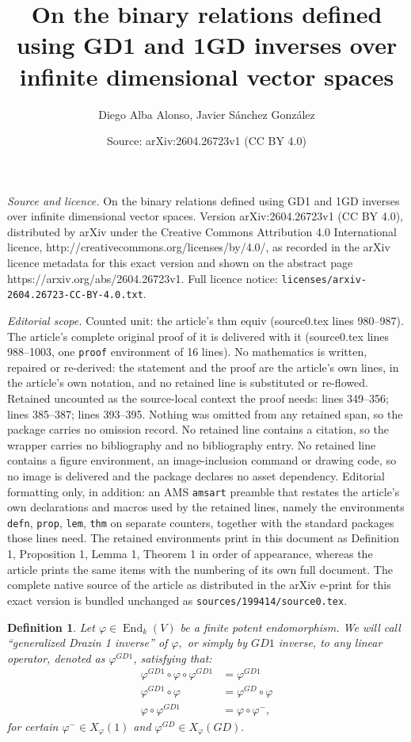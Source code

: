 \documentclass[10pt,a4paper]{amsart}
\title{On the binary relations defined using GD1 and 1GD inverses over infinite dimensional vector spaces}
\author{Diego Alba Alonso, Javier S\'anchez Gonz\'alez}
\date{Source: arXiv:2604.26723v1 (CC BY 4.0)}
\newtheorem{defn}{Definition}
\newcommand\ed{\operatorname{End}}
\newcommand{\f}{\varphi}
\begin{document}
\maketitle

\noindent\emph{Source and licence.} On the binary relations defined using GD1 and 1GD inverses over infinite dimensional vector spaces. Version arXiv:2604.26723v1 (CC BY 4.0), distributed by arXiv under the Creative Commons Attribution 4.0 International licence, http://creativecommons.org/licenses/by/4.0/, as recorded in the arXiv licence metadata for this exact version and shown on the abstract page https://arxiv.org/abs/2604.26723v1. Full licence notice: \texttt{licenses/arxiv-2604.26723-CC-BY-4.0.txt}.\par\smallskip

\noindent\textit{Editorial scope.} Counted unit: the article's thm equiv (source0.tex lines 980--987). The article's complete original proof of it is delivered with it (source0.tex lines 988--1003, one \texttt{proof} environment of 16 lines). No mathematics is written, repaired or re-derived: the statement and the proof are the article's own lines, in the article's own notation, and no retained line is substituted or re-flowed.  Retained uncounted as the source-local context the proof needs: lines 349--356; lines 385--387; lines 393--395.  Nothing was omitted from any retained span, so the package carries no omission record.  No retained line contains a citation, so the wrapper carries no bibliography and no bibliography entry.  No retained line contains a figure environment, an image-inclusion command or drawing code, so no image is delivered and the package declares no asset dependency.  Editorial formatting only, in addition: an AMS \texttt{amsart} preamble that restates the article's own declarations and macros used by the retained lines, namely the environments \texttt{defn}, \texttt{prop}, \texttt{lem}, \texttt{thm} on separate counters, together with the standard packages those lines need.  The retained environments print in this document as Definition 1, Proposition 1, Lemma 1, Theorem 1 in order of appearance, whereas the article prints the same items with the numbering of its own full document.  The complete native source of the article as distributed in the arXiv e-print for this exact version is bundled unchanged as \texttt{sources/199414/source0.tex}.
\begin{defn}\label{D: GD1 }
Let $\f \in \ed_k(V)$ be a finite potent endomorphism. We will call ``generalized Drazin 1 inverse'' of $\f,$ or simply by $GD1$ inverse, to any linear operator, denoted as $\f^{GD1}$, satisfying that: \begin{align*}
\f^{GD1}\circ \f \circ \f^{GD1}& =\f^{GD1}\\
\f^{GD1}\circ \f & = \f^{GD}\circ \f \\
\f\circ \f^{GD1} & = \f \circ \f^-,
\end{align*} 
for certain $\f^-\in X_{\f}(1)$ and $\f^{GD}\in X_{\f}(GD).$
\end{defn} 
\end{document}
